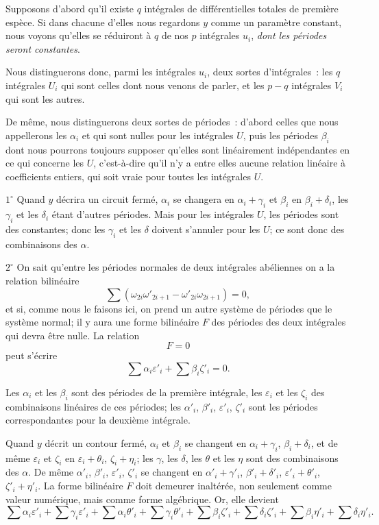 \documentclass{article}
\begin{document}
Supposons d'abord qu'il existe $q$ intégrales de différentielles totales de première espèce. Si dans chacune d'elles nous regardons $y$ comme un paramètre constant, nous voyons qu'elles se réduiront à $q$ de nos $p$ intégrales $u_{i}$, \emph{dont les périodes seront constantes}.

Nous distinguerons donc, parmi les intégrales $u_{i}$, deux sortes d'intégrales~: les $q$ intégrales $U_{i}$ qui sont celles dont nous venons de parler, et les $p - q$ intégrales $V_{i}$ qui sont les autres.

De même, nous distinguerons deux sortes de périodes~: d'abord celles que nous appellerons les $\alpha_{i}$ et qui sont nulles pour les intégrales $U$, puis les périodes $\beta_{i}$ dont nous pourrons toujours supposer qu'elles sont linéairement indépendantes en ce qui concerne les $U$, c'est-à-dire qu'il n'y a entre elles aucune relation linéaire à coefficients entiers, qui soit vraie pour toutes les intégrales $U$.

$1^\circ$ Quand $y$ décrira un circuit fermé, $\alpha_{i}$ se changera en $\alpha_{i} + \gamma_{i}$ et $\beta_{i}$ en $\beta_{i} + \delta_{i}$, les $\gamma_{i}$ et les $\delta_{i}$ étant d'autres périodes. Mais pour les intégrales $U$, les périodes sont des constantes; donc les $\gamma_{i}$ et les $\delta$ doivent s'annuler pour les $U$; ce sont donc des combinaisons des $\alpha$.

$2^\circ$ On sait qu'entre les périodes normales de deux intégrales abéliennes on a la relation bilinéaire
\[
\sum (\omega_{2i}\omega'_{2i+1} - \omega'_{2i}\omega_{2i+1}) = 0,
\]
et si, comme nous le faisons ici, on prend un autre système de périodes que le système normal; il y aura une forme bilinéaire $F$ des périodes des deux intégrales qui devra être nulle. La relation
\[
F = 0
\]
peut s'écrire
\[
\sum \alpha_{i} \varepsilon'_{i} + \sum \beta_{i} \zeta'_{i} = 0.
\]

Les $\alpha_{i}$ et les $\beta_{i}$ sont des périodes de la première intégrale, les $\varepsilon_{i}$ et les $\zeta_{i}$ des combinaisons linéaires de ces périodes; les $\alpha'_{i}$, $\beta'_{i}$, $\varepsilon'_{i}$, $\zeta'_{i}$ sont les périodes correspondantes pour la deuxième intégrale.

Quand $y$ décrit un contour fermé, $\alpha_{i}$ et $\beta_{i}$ se changent en $\alpha_{i} + \gamma_{i}$, $\beta_{i} + \delta_{i}$, et de même $\varepsilon_{i}$ et $\zeta_{i}$ en $\varepsilon_{i} + \theta_{i}$, $\zeta_{i} + \eta_{i}$; les $\gamma$, les $\delta$, les $\theta$ et les $\eta$ sont des combinaisons des $\alpha$. De même $\alpha'_{i}$, $\beta'_{i}$, $\varepsilon'_{i}$, $\zeta'_{i}$ se changent en $\alpha'_{i} + \gamma'_{i}$, $\beta'_{i} + \delta'_{i}$, $\varepsilon'_{i} + \theta'_{i}$, $\zeta'_{i} + \eta'_{i}$. La forme bilinéaire $F$ doit demeurer inaltérée, non seulement comme valeur numérique, mais comme forme algébrique. Or, elle devient
\[
\sum \alpha_{i} \varepsilon'_{i} + \sum \gamma_{i} \varepsilon'_{i} + \sum \alpha_{i} \theta'_{i} + \sum \gamma_{i} \theta'_{i} + \sum \beta_{i} \zeta'_{i} + \sum \delta_{i} \zeta'_{i} + \sum \beta_{i} \eta'_{i} + \sum \delta_{i} \eta'_{i}.
\]
\end{document}
